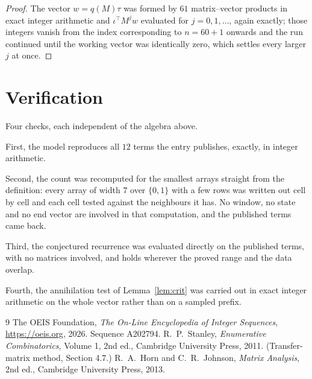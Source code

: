 \documentclass[11pt,a4paper]{article}
\theoremstyle{plain}
\theoremstyle{definition}
\begin{document}
\begin{proof}
The vector $w=q(M)\tau$ was formed by $61$ matrix--vector products in exact integer
arithmetic and $\iota^{\!\top}M^{j}w$ evaluated for $j=0,1,\dots$, again exactly; those
integers vanish from the index corresponding to $n=60+1$ onwards and the run continued
until the working vector was identically zero, which settles every larger $j$ at once.
\end{proof}

\section{Verification}

Four checks, each independent of the algebra above.

First, the model reproduces all $12$ terms the entry publishes, exactly, in integer
arithmetic.

Second, the count was recomputed for the smallest arrays straight from the definition: every
array of width $7$ over $\{0,1\}$ with a few rows was written out cell by cell and each cell
tested against the neighbours it has. No window, no state and no end vector are involved in that
computation, and the published terms came back.

Third, the conjectured recurrence was evaluated directly on the published terms, with no
matrices involved, and holds wherever the proved range and the data overlap.

Fourth, the annihilation test of Lemma~\ref{lem:crit} was carried out in exact integer
arithmetic on the whole vector rather than on a sampled prefix.

\begin{thebibliography}{9}
 The OEIS Foundation, \emph{The On-Line Encyclopedia of Integer
Sequences}, \url{https://oeis.org}, 2026. Sequence A202794.
 R.~P.~Stanley, \emph{Enumerative Combinatorics}, Volume 1, 2nd ed.,
Cambridge University Press, 2011. (Transfer-matrix method, Section 4.7.)
 R.~A.~Horn and C.~R.~Johnson, \emph{Matrix Analysis}, 2nd ed., Cambridge
University Press, 2013.
\end{thebibliography}
\end{document}
